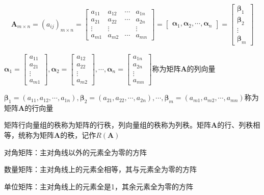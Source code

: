 \documentclass[12pt]{book}
\begin{document}
\begin{gather*}
    \mathbf{A}_{m\times n} = (a_{ij})_{m\times n} = 
    \begin{bmatrix}
        a_{11} & a_{12} & \cdots & a_{1n} \\
        a_{21} & a_{22} & \cdots & a_{2n} \\
        \vdots & \vdots &        & \vdots \\
        a_{m1} & a_{m2} & \cdots & a_{mn} 
    \end{bmatrix}
    = \begin{bmatrix}
        \bm{\alpha}_1 , \bm{\alpha}_2 , \cdots , \bm{\alpha}_n  
    \end{bmatrix}
    = \begin{bmatrix}
        \bm{\beta}_1 \\\bm{\beta}_2 \\ \vdots \\\bm{\beta}_m
    \end{bmatrix}
\end{gather*}
\par  $\bm{\alpha}_1 = \begin{bmatrix}
        a_{11}\\a_{21}\\\vdots\\a_{m1}
    \end{bmatrix},
    \bm{\alpha}_2 = \begin{bmatrix}
        a_{12}\\a_{22}\\\vdots\\a_{m2}
    \end{bmatrix},\cdots,
    \bm{\alpha}_n = \begin{bmatrix}
        a_{1n}\\a_{2n}\\\vdots\\a_{mn}
    \end{bmatrix}$称为矩阵$\bm{A}$的列向量
\par $ \bm{\beta}_1=(a_{11},a_{12},\cdots,a_{1n}), \bm{\beta}_2= (a_{21},a_{22},\cdots,a_{2n}),\cdots,\bm{\beta}_m=(a_{m1},a_{m2},\cdots,a_{mn}) $称为矩阵$\bm{A}$的行向量
\par 矩阵行向量组的秩称为矩阵的行秩，列向量组的秩称为列秩。矩阵$\bm{A}$的行、列秩相等，统称为矩阵$\bm{A}$的秩，记作$R(\bm{A})$
\par 对角矩阵：主对角线以外的元素全为零的方阵
\par 数量矩阵：主对角线上的元素全相等，其与元素全为零的方阵
\par 单位矩阵：主对角线上的元素全是1，其余元素全为零的方阵
\end{document}
